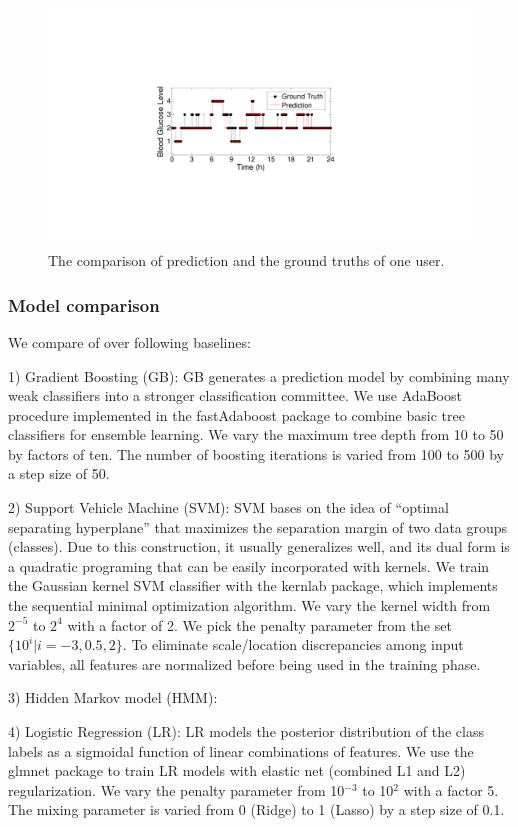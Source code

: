 \begin{figure}[!t]
\centering
\includegraphics[width=0.5\columnwidth]{./img/pred_vs_gt.pdf}
\caption{The comparison of prediction and the ground truths of one user.}
\label{fig:pre_gt}
\end{figure}


\subsubsection{Model comparison}

We compare \modelname of \sysname over following baselines:

1) Gradient Boosting (GB): GB generates a prediction model by combining many weak classifiers into a stronger classification committee. We use AdaBoost procedure implemented in the fastAdaboost package to combine basic tree classifiers for ensemble learning. We vary the maximum tree depth from 10 to 50 by factors of ten. The number of boosting iterations is varied from 100 to 500 by a step size of 50.

2) Support Vehicle Machine (SVM): SVM bases on the idea of “optimal separating hyperplane” that maximizes the separation margin of two data groups (classes). Due to this construction, it usually generalizes well, and its dual form is a quadratic programing that can be easily incorporated with kernels. We train the Gaussian kernel SVM classifier with the kernlab package, which implements the sequential minimal optimization algorithm. We vary the kernel width from $2^{-5}$ to $2^4$ with a factor of 2. We pick the penalty parameter from the set $\{10^i | i = -3, 0.5, 2\}$. To eliminate scale/location discrepancies among input variables, all features are normalized before being used in the training phase.

3) Hidden Markov model (HMM): 

4) Logistic Regression (LR): LR models the posterior distribution of the class labels as a sigmoidal function of linear combinations of features. We use the glmnet package to train LR models with elastic net (combined L1 and L2) regularization. We vary the penalty parameter from 10$^{-3}$ to 10$^2$ with a factor 5. The mixing parameter is varied from 0 (Ridge) to 1 (Lasso) by a step size of 0.1. 


